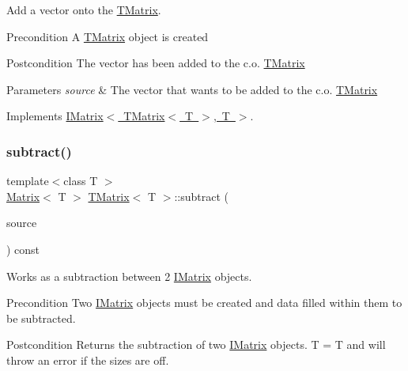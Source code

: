 Add a vector onto the \mbox{\hyperlink{class_t_matrix}{T\+Matrix}}. 

\begin{DoxyPrecond}{Precondition}
A \mbox{\hyperlink{class_t_matrix}{T\+Matrix}} object is created 
\end{DoxyPrecond}
\begin{DoxyPostcond}{Postcondition}
The vector has been added to the c.\+o. \mbox{\hyperlink{class_t_matrix}{T\+Matrix}}
\end{DoxyPostcond}

\begin{DoxyParams}{Parameters}
{\em source} & The vector that wants to be added to the c.\+o. \mbox{\hyperlink{class_t_matrix}{T\+Matrix}} \\
\hline
\end{DoxyParams}


Implements \mbox{\hyperlink{class_i_matrix_aa5de147c7aa5b74b0f2177ed1a8158de}{I\+Matrix$<$ T\+Matrix$<$ T $>$, T $>$}}.

\mbox{\label{class_t_matrix_ae9cbcbaa97ed98b315d59f0d7dce7fd8}} 
\subsubsection{\texorpdfstring{subtract()}{subtract()}\hspace{0.1cm}{\footnotesize\ttfamily [1/6]}}
{\footnotesize\ttfamily template$<$class T $>$ \\
\mbox{\hyperlink{class_matrix}{Matrix}}$<$ T $>$ \mbox{\hyperlink{class_t_matrix}{T\+Matrix}}$<$ T $>$\+::subtract (\begin{DoxyParamCaption}\item[{const \mbox{\hyperlink{class_i_matrix}{I\+Matrix}}$<$ \mbox{\hyperlink{class_matrix}{Matrix}}$<$ T $>$, T $>$ \&}]{source }\end{DoxyParamCaption}) const}



Works as a subtraction between 2 \mbox{\hyperlink{class_i_matrix}{I\+Matrix}} objects. 

\begin{DoxyPrecond}{Precondition}
Two \mbox{\hyperlink{class_i_matrix}{I\+Matrix}} objects must be created and data filled within them to be subtracted. 
\end{DoxyPrecond}
\begin{DoxyPostcond}{Postcondition}
Returns the subtraction of two \mbox{\hyperlink{class_i_matrix}{I\+Matrix}} objects. T = T and will throw an error if the sizes are off.
\end{DoxyPostcond}


